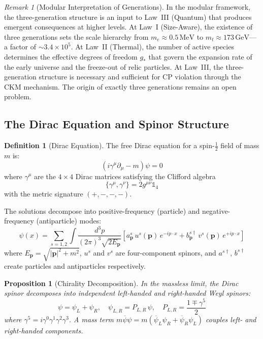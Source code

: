 \documentclass[12pt]{article}
\newtheorem{proposition}[theorem]{Proposition}
\theoremstyle{definition}
\newtheorem{definition}[theorem]{Definition}
\theoremstyle{remark}
\newtheorem{remark}[theorem]{Remark}
\newcommand{\psibar}{\overline{\psi}}
\newcommand{\GeV}{\,\mathrm{GeV}}
\newcommand{\MeV}{\,\mathrm{MeV}}
\begin{document}
\begin{remark}[Modular Interpretation of Generations]
\label{rem:generations}
In the modular framework, the three-generation structure is an input to Law~III (Quantum) that produces emergent consequences at higher levels. At Law~I (Size-Aware), the existence of three generations sets the scale hierarchy from $m_e \approx 0.5\MeV$ to $m_t \approx 173\GeV$---a factor of $\sim 3.4 \times 10^5$. At Law~II (Thermal), the number of active species determines the effective degrees of freedom $g_*$ that govern the expansion rate of the early universe and the freeze-out of relic particles. At Law~III, the three-generation structure is necessary and sufficient for CP violation through the CKM mechanism. The origin of exactly three generations remains an open problem.
\end{remark}

\subsection{The Dirac Equation and Spinor Structure}

\begin{definition}[Dirac Equation]
\label{def:dirac}
The free Dirac equation for a spin-$\frac{1}{2}$ field of mass $m$ is:
\begin{equation}
\label{eq:diraceq}
(i\gamma^\mu \partial_\mu - m)\psi = 0
\end{equation}
where $\gamma^\mu$ are the $4 \times 4$ Dirac matrices satisfying the Clifford algebra
\begin{equation}
\{\gamma^\mu, \gamma^\nu\} = 2 g^{\mu\nu} \mathbb{1}_4
\end{equation}
with the metric signature $(+,-,-,-)$.
\end{definition}

The solutions decompose into positive-frequency (particle) and negative-frequency (antiparticle) modes:
\begin{equation}
\psi(x) = \sum_{s=1,2} \int \frac{d^3p}{(2\pi)^3 \sqrt{2E_\mathbf{p}}} \left[ a^s_\mathbf{p} \, u^s(\mathbf{p})\, e^{-ip \cdot x} + b^{s\dagger}_\mathbf{p} \, v^s(\mathbf{p})\, e^{+ip \cdot x} \right]
\end{equation}
where $E_\mathbf{p} = \sqrt{|\mathbf{p}|^2 + m^2}$, $u^s$ and $v^s$ are four-component spinors, and $a^{s\dagger}$, $b^{s\dagger}$ create particles and antiparticles respectively.

\begin{proposition}[Chirality Decomposition]
\label{prop:chirality}
In the massless limit, the Dirac spinor decomposes into independent left-handed and right-handed Weyl spinors:
\begin{equation}
\psi = \psi_L + \psi_R, \quad \psi_{L,R} = P_{L,R}\, \psi, \quad P_{L,R} = \frac{1 \mp \gamma^5}{2}
\end{equation}
where $\gamma^5 = i\gamma^0\gamma^1\gamma^2\gamma^3$. A mass term $m\psibar\psi = m(\psibar_L\psi_R + \psibar_R\psi_L)$ couples left- and right-handed components.
\end{proposition}
\end{document}
